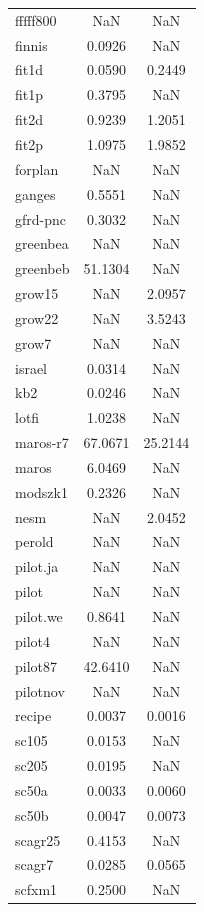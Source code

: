 \begin{longtable}{lcc}
fffff800 &      NaN &      NaN \\
finnis   &   0.0926 &      NaN \\
fit1d    &   0.0590 &   0.2449 \\
fit1p    &   0.3795 &      NaN \\
fit2d    &   0.9239 &   1.2051 \\
fit2p    &   1.0975 &   1.9852 \\
forplan  &      NaN &      NaN \\
ganges   &   0.5551 &      NaN \\
gfrd-pnc &   0.3032 &      NaN \\
greenbea &      NaN &      NaN \\
greenbeb &  51.1304 &      NaN \\
grow15   &      NaN &   2.0957 \\
grow22   &      NaN &   3.5243 \\
grow7    &      NaN &      NaN \\
israel   &   0.0314 &      NaN \\
kb2      &   0.0246 &      NaN \\
lotfi    &   1.0238 &      NaN \\
maros-r7 &  67.0671 &  25.2144 \\
maros    &   6.0469 &      NaN \\
modszk1  &   0.2326 &      NaN \\
nesm     &      NaN &   2.0452 \\
perold   &      NaN &      NaN \\
pilot.ja &      NaN &      NaN \\
pilot    &      NaN &      NaN \\
pilot.we &   0.8641 &      NaN \\
pilot4   &      NaN &      NaN \\
pilot87  &  42.6410 &      NaN \\
pilotnov &      NaN &      NaN \\
recipe   &   0.0037 &   0.0016 \\
sc105    &   0.0153 &      NaN \\
sc205    &   0.0195 &      NaN \\
sc50a    &   0.0033 &   0.0060 \\
sc50b    &   0.0047 &   0.0073 \\
scagr25  &   0.4153 &      NaN \\
scagr7   &   0.0285 &   0.0565 \\
scfxm1   &   0.2500 &      NaN \\

\end{longtable}
